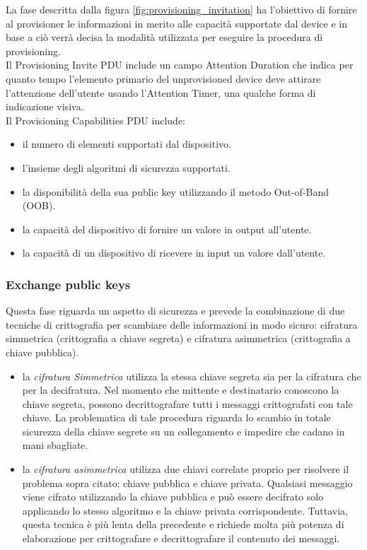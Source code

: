 \noindent La fase descritta dalla figura \ref{fig:provisioning_invitation} ha l'obiettivo di fornire al provisioner le informazioni in merito alle capacità supportate dal device e in base a ciò verrà decisa la modalità utilizzata per eseguire la procedura di provisioning.\\

\noindent Il Provisioning Invite PDU include un campo Attention Duration che indica per quanto tempo l'elemento primario del unprovisioned device deve attirare l'attenzione dell'utente usando l'Attention Timer, una qualche forma di indicazione visiva.\\
Il Provisioning Capabilities PDU include:
\begin{itemize}
    \item il numero di elementi supportati dal dispositivo.
    \item l'insieme degli algoritmi di sicurezza supportati.
    \item la disponibilità della sua public key utilizzando il metodo Out-of-Band (OOB).
    \item la capacità del dispositivo di fornire un valore in output all'utente.
    \item la capacità di un dispositivo di ricevere in input un valore dall'utente.
\end{itemize}

\subsubsection{Exchange public keys}
Questa fase riguarda un aspetto di sicurezza e prevede la combinazione di due tecniche di crittografia per scambiare delle informazioni in modo sicuro: cifratura simmetrica (crittografia a chiave segreta) e cifratura asimmetrica (crittografia a chiave pubblica).

\begin{itemize}
    \item la \textit{cifratura Simmetrica} utilizza la stessa chiave segreta sia per la cifratura che per la decifratura. Nel momento che mittente e destinatario conoscono la chiave segreta, possono decrittografare tutti i messaggi crittografati con tale chiave. La problematica di tale procedura riguarda lo scambio in totale sicurezza della chiave segrete su un collegamento e impedire che cadano in mani sbagliate.

    \item la \textit{cifratura asimmetrica} utilizza due chiavi correlate proprio per risolvere il problema sopra citato: chiave pubblica e chiave privata. Qualsiasi messaggio viene cifrato utilizzando la chiave pubblica e può essere decifrato solo applicando lo stesso algoritmo e la chiave privata corrispondente. Tuttavia, questa tecnica è più lenta della precedente e richiede molta più potenza di elaborazione per crittografare e decrittografare il contenuto dei messaggi.
\end{itemize}

